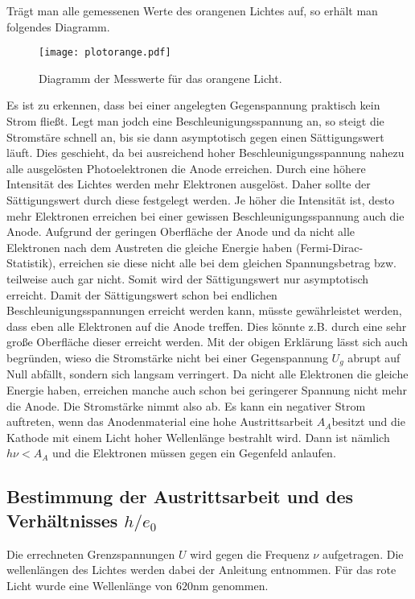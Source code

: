 Trägt man alle gemessenen Werte des orangenen Lichtes auf, so erhält man folgendes Diagramm.

\begin{figure}[H]
  \centering
  \texttt{[image: plotorange.pdf]}
  \caption{Diagramm der Messwerte für das orangene Licht.}
  \label{fig:plotorange}
\end{figure}

Es ist zu erkennen, dass bei einer angelegten Gegenspannung praktisch kein Strom fließt. Legt man
jodch eine Beschleunigungsspannung an, so steigt die Stromstäre schnell an, bis sie dann
asymptotisch gegen einen Sättigungswert läuft.
Dies geschieht, da bei ausreichend hoher Beschleunigungsspannung nahezu alle ausgelösten
Photoelektronen die Anode erreichen. Durch eine höhere Intensität des Lichtes werden mehr
Elektronen ausgelöst. Daher sollte der Sättigungswert durch diese festgelegt werden. Je höher
die Intensität ist, desto mehr Elektronen erreichen bei einer gewissen Beschleunigungsspannung
auch die Anode.
Aufgrund der geringen Oberfläche der Anode und da nicht alle Elektronen nach dem Austreten die gleiche Energie haben (Fermi-Dirac-Statistik), erreichen sie diese
nicht alle bei dem gleichen Spannungsbetrag bzw. teilweise auch gar nicht. Somit wird der Sättigungswert nur asymptotisch erreicht.
Damit der Sättigungswert schon bei endlichen Beschleunigungsspannungen erreicht werden kann, müsste gewährleistet werden, dass eben
alle Elektronen auf die Anode treffen. Dies könnte z.B. durch eine sehr große Oberfläche dieser erreicht werden.
Mit der obigen Erklärung lässt sich auch begründen, wieso die Stromstärke nicht bei einer Gegenspannung $U_g$ abrupt auf Null abfällt, sondern
sich langsam verringert. Da nicht alle Elektronen die gleiche Energie haben, erreichen manche auch schon bei geringerer Spannung nicht mehr
die Anode. Die Stromstärke nimmt also ab.
Es kann ein negativer Strom auftreten, wenn das Anodenmaterial eine hohe Austrittsarbeit $A_A$besitzt und die Kathode mit einem Licht hoher
Wellenlänge bestrahlt wird. Dann ist nämlich $h\nu<A_A$ und die Elektronen müssen gegen ein Gegenfeld anlaufen.


\subsection{Bestimmung der Austrittsarbeit und des Verhältnisses $h/e_0$}

Die errechneten Grenzspannungen $U$ wird gegen die Frequenz $\nu$ aufgetragen. Die wellenlängen des Lichtes werden dabei der
Anleitung entnommen. Für das rote Licht wurde eine Wellenlänge von $620$nm genommen.


